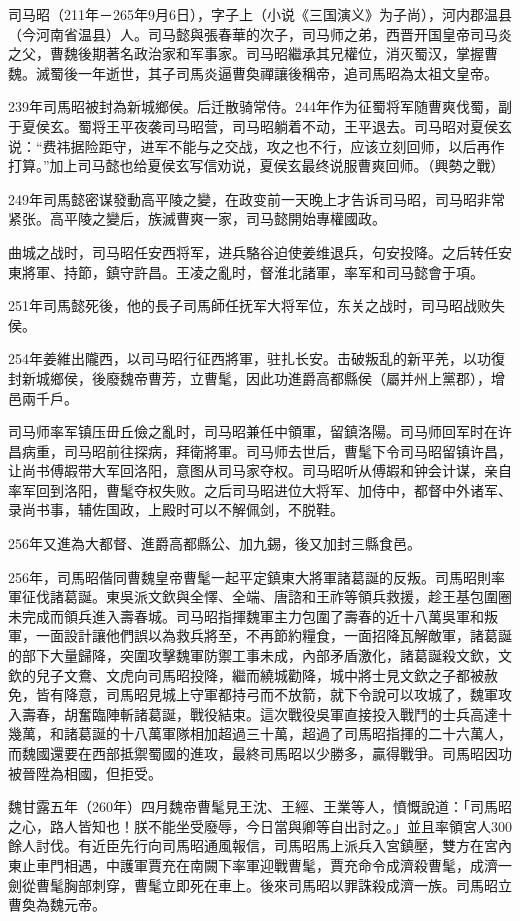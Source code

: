 司马昭（211年－265年9月6日），字子上（小说《三国演义》为子尚），河内郡温县（今河南省温县）人。司马懿與張春華的次子，司马师之弟，西晋开国皇帝司马炎之父，曹魏後期著名政治家和军事家。司马昭繼承其兄權位，消灭蜀汉，掌握曹魏。滅蜀後一年逝世，其子司馬炎逼曹奐禪讓後稱帝，追司馬昭為太祖文皇帝。

239年司馬昭被封為新城鄉侯。后迁散骑常侍。244年作为征蜀将军随曹爽伐蜀，副于夏侯玄。蜀将王平夜袭司马昭营，司马昭躺着不动，王平退去。司马昭对夏侯玄说：“费祎据险距守，进军不能与之交战，攻之也不行，应该立刻回师，以后再作打算。”加上司马懿也给夏侯玄写信劝说，夏侯玄最终说服曹爽回师。（興勢之戰）

249年司馬懿密谋發動高平陵之變，在政变前一天晚上才告诉司马昭，司马昭非常紧张。高平陵之變后，族滅曹爽一家，司马懿開始專權國政。

曲城之战时，司马昭任安西将军，进兵駱谷迫使姜维退兵，句安投降。之后转任安東將軍、持節，鎮守許昌。王凌之亂时，督淮北諸軍，率军和司马懿會于項。

251年司馬懿死後，他的長子司馬師任抚军大将军位，东关之战时，司马昭战败失侯。

254年姜維出隴西，以司马昭行征西將軍，驻扎长安。击破叛乱的新平羌，以功復封新城鄉侯，後廢魏帝曹芳，立曹髦，因此功進爵高都縣侯（屬并州上黨郡），增邑兩千戶。

司马师率军镇压毌丘儉之亂时，司马昭兼任中領軍，留鎮洛陽。司马师回军时在许昌病重，司马昭前往探病，拜衛將軍。司马师去世后，曹髦下令司马昭留镇许昌，让尚书傅嘏带大军回洛阳，意图从司马家夺权。司马昭听从傅嘏和钟会计谋，亲自率军回到洛阳，曹髦夺权失败。之后司马昭进位大将军、加侍中，都督中外诸军、录尚书事，辅佐国政，上殿时可以不解佩剑，不脱鞋。

256年又進為大都督、進爵高都縣公、加九錫，後又加封三縣食邑。

256年，司馬昭偕同曹魏皇帝曹髦一起平定鎮東大將軍諸葛誕的反叛。司馬昭則率軍征伐諸葛誕。東吳派文欽與全懌、全端、唐諮和王祚等領兵救援，趁王基包圍圈未完成而領兵進入壽春城。司马昭指揮魏軍主力包圍了壽春的近十八萬吳軍和叛軍，一面設計讓他們誤以為救兵將至，不再節約糧食，一面招降瓦解敵軍，諸葛誕的部下大量歸降，突圍攻擊魏軍防禦工事未成，內部矛盾激化，諸葛誕殺文欽，文欽的兒子文鴦、文虎向司馬昭投降，繼而繞城勸降，城中將士見文欽之子都被赦免，皆有降意，司馬昭見城上守軍都持弓而不放箭，就下令說可以攻城了，魏軍攻入壽春，胡奮臨陣斬諸葛誕，戰役結束。這次戰役吳軍直接投入戰鬥的士兵高達十幾萬，和諸葛誕的十八萬軍隊相加超過三十萬，超過了司馬昭指揮的二十六萬人，而魏國還要在西部抵禦蜀國的進攻，最終司馬昭以少勝多，贏得戰爭。司馬昭因功被晉陞為相國，但拒受。

魏甘露五年（260年）四月魏帝曹髦見王沈、王經、王業等人，憤慨說道：「司馬昭之心，路人皆知也！朕不能坐受廢辱，今日當與卿等自出討之。」並且率領宮人300餘人討伐。有近臣先行向司馬昭通風報信，司馬昭馬上派兵入宮鎮壓，雙方在宮內東止車門相遇，中護軍賈充在南闕下率軍迎戰曹髦，賈充命令成濟殺曹髦，成濟一劍從曹髦胸部刺穿，曹髦立即死在車上。後來司馬昭以罪誅殺成濟一族。司馬昭立曹奐為魏元帝。

